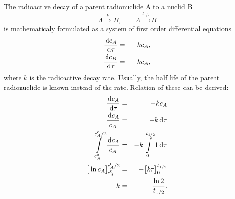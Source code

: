 The radioactive decay of a parent radionuclide A to a nuclid B
%
\[ A\xrightarrow{k} B, \qquad A\xrightarrow{t_{1/2}} B \]
%
is mathematicaly formulated as a system of first order differential equations
%
\begin{eqnarray} \label{eqn:halflife}
  \frac{\d c_A}{\d\tau} &=& -k c_A, \\
  \frac{\d c_B}{\d\tau} &=& k c_A,
\end{eqnarray}
%
where $k$ is the radioactive decay rate. Usually, the half life of the parent radionuclide  
is known instead of the rate. Relation of these can be derived:
%
\begin{eqnarray*}
    \frac{\,{\rm d} c_A}{\,{\rm d}\tau} &=& -k c_A\\
    \frac{\,{\rm d} c_A}{c_A} &=& -k \,{\rm d}\tau\\
    \int\limits_{c_A^0}^{c_A^0/2}\frac{\,{\rm d} c_A}{c_A} &=& -k\int\limits_{0}^{t_{1/2}} 1\,{\rm d}\tau\\
    \big[ \ln c_A\big]^{c_A^0/2}_{c_A^0} &=& -\big[k\tau\big]^{t_{1/2}}_{0}\\
    k &=& \frac{\ln 2}{t_{1/2}}.
\end{eqnarray*}


